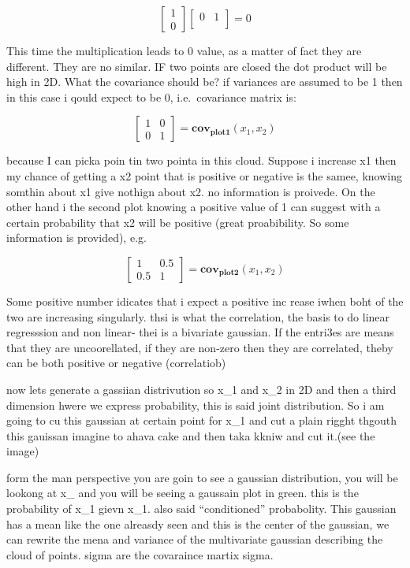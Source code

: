 \documentclass[
  12pt,
  a4paper,
  oneside]{book}
\theoremstyle{definition}
\theoremstyle{definition}
\theoremstyle{definition}
\theoremstyle{remark}
\begin{document}
\[
\left[\begin{array}{ll}
1 \\
0
\end{array}\right]\left[\begin{array}{ll}
0 & 1 \\
\end{array}\right] = 0
\]

This time the multiplication leads to 0 value, as a matter of fact they are different. They are no similar.
IF two points are closed the dot product will be high in 2D. What the covariance should be? if variances are assumed to be 1 then in this case i qould expect to be 0, i.e.~covariance matrix is:

\[
\left[\begin{array}{ll}
1 & 0 \\
0 & 1
\end{array}\right] = \mathbf{cov_{plot1}}(x_1,x_2)
\]

because I can picka poin tin two pointa in this cloud. Suppose i increase x1 then my chance of getting a x2 point that is positive or negative is the samee, knowing somthin about x1 give nothign about x2. no information is proivede. On the other hand i the second plot knowing a positive value of 1 can suggest with a certain probability that x2 will be positive (great proabibility. So some information is provided), e.g.

\[
\left[\begin{array}{ll}
1   & 0.5 \\
0.5 & 1
\end{array}\right] = \mathbf{cov_{plot2}}(x_1,x_2)
\]

Some positive number idicates that i expect a positive inc rease iwhen boht of the two are increasing singularly. thsi is what the correlation, the basis to do linear regresssion and non linear- thei is a bivariate gaussian. If the entri3es are means that they are uncoorellated, if they are non-zero then they are correlated, theby can be both positive or negative (correlatiob)

now lets generate a gassiian distrivution so x\_1 and x\_2 in 2D and then a third dimension hwere we express probability, this is said joint distribution. So i am going to cu this gaussian at certain point for x\_1 and cut a plain rigght thgouth this gauissan imagine to ahava cake and then taka kkniw and cut it.(see the image)

form the man perspective you are goin to see a gaussian distribution, you will be lookong at x\_ and you will be seeing a gaussain plot in green. this is the probability of x\_1 gievn x\_1. also said ``conditioned'' probabolity. This gaussian has a mean like the one alreasdy seen and this is the center of the gaussian, we can rewrite the mena and variance of the multivariate gaussian describing the cloud of points. sigma are the covaraince martix sigma.
\end{document}
